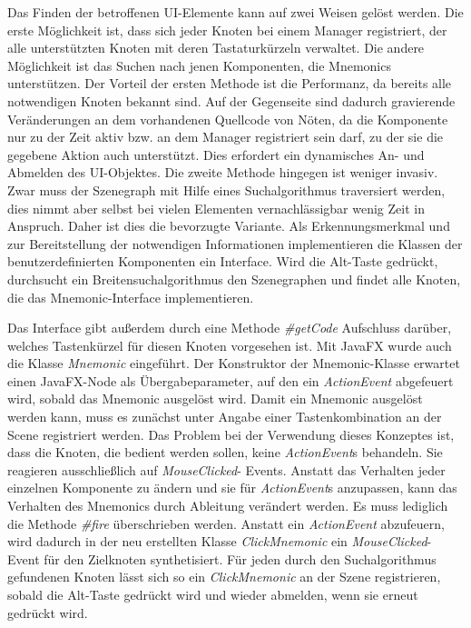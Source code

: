 Das Finden der betroffenen UI-Elemente kann auf zwei Weisen gelöst werden. Die erste Möglichkeit ist, dass sich jeder Knoten bei einem Manager registriert, der alle unterstützten Knoten mit deren Tastaturkürzeln verwaltet. Die andere Möglichkeit ist das Suchen nach jenen Komponenten, die Mnemonics unterstützen. Der Vorteil der ersten Methode ist die Performanz, da bereits alle notwendigen Knoten bekannt sind. Auf der Gegenseite sind dadurch gravierende Veränderungen an dem vorhandenen Quellcode von Nöten, da die Komponente nur zu der Zeit aktiv bzw. an dem Manager registriert sein darf, zu der sie die gegebene Aktion auch unterstützt. Dies erfordert ein dynamisches An- und Abmelden des UI-Objektes. Die zweite Methode hingegen ist weniger invasiv. Zwar muss der Szenegraph mit Hilfe eines Suchalgorithmus traversiert werden, dies nimmt aber selbst bei vielen Elementen vernachlässigbar wenig Zeit in Anspruch. Daher ist dies die bevorzugte Variante. Als Erkennungsmerkmal und zur Bereitstellung der notwendigen Informationen implementieren die Klassen der benutzerdefinierten Komponenten ein Interface. Wird die Alt-Taste gedrückt, durchsucht ein Breitensuchalgorithmus den Szenegraphen und findet alle Knoten, die das Mnemonic-Interface implementieren.\par
Das Interface gibt außerdem durch eine Methode \textit{\#{}getCode} Aufschluss darüber, welches Tastenkürzel für diesen Knoten vorgesehen ist. Mit JavaFX wurde auch die Klasse \textit{Mnemonic} eingeführt. Der Konstruktor der Mnemonic-Klasse erwartet einen JavaFX-Node als Übergabeparameter, auf den ein \textit{ActionEvent} abgefeuert wird, sobald das Mnemonic ausgelöst wird. Damit ein Mnemonic ausgelöst werden kann, muss es zunächst unter Angabe einer Tastenkombination an der Scene registriert werden. Das Problem bei der Verwendung dieses Konzeptes ist, dass die Knoten, die bedient werden sollen, keine \textit{ActionEvent}s behandeln. Sie reagieren ausschließlich auf \textit{MouseClicked}- Events. Anstatt das Verhalten jeder einzelnen Komponente zu ändern und sie für \textit{ActionEvent}s anzupassen, kann das Verhalten des Mnemonics durch Ableitung verändert werden. Es muss lediglich die Methode \textit{\#{}fire} überschrieben werden. Anstatt ein \textit{ActionEvent} abzufeuern, wird dadurch in der neu erstellten Klasse \textit{ClickMnemonic} ein \textit{MouseClicked}- Event für den Zielknoten synthetisiert. Für jeden durch den Suchalgorithmus gefundenen Knoten lässt sich so ein \textit{ClickMnemonic} an der Szene registrieren, sobald die Alt-Taste gedrückt wird und wieder abmelden, wenn sie erneut gedrückt wird.\par
